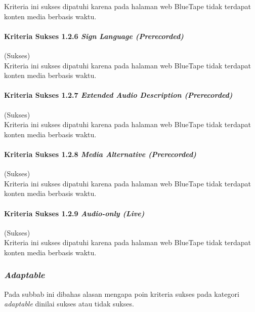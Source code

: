 Kriteria ini sukses dipatuhi karena pada halaman web BlueTape tidak terdapat konten media berbasis waktu.

\paragraph{Kriteria Sukses 1.2.6 \textit{Sign Language (Prerecorded)}}
\label{par:kepatuhan_bluetape_kriteria_sukses_1.2.6}
(Sukses)\\

Kriteria ini sukses dipatuhi karena pada halaman web BlueTape tidak terdapat konten media berbasis waktu.

\paragraph{Kriteria Sukses 1.2.7 \textit{Extended Audio Description (Prerecorded)}}
\label{par:kepatuhan_bluetape_kriteria_sukses_1.2.7}
(Sukses)\\

Kriteria ini sukses dipatuhi karena pada halaman web BlueTape tidak terdapat konten media berbasis waktu.

\paragraph{Kriteria Sukses 1.2.8 \textit{Media Alternative (Prerecorded)}}
\label{par:kepatuhan_bluetape_kriteria_sukses_1.2.8}
(Sukses)\\

Kriteria ini sukses dipatuhi karena pada halaman web BlueTape tidak terdapat konten media berbasis waktu.

\paragraph{Kriteria Sukses 1.2.9 \textit{Audio-only (Live)}}
\label{par:kepatuhan_bluetape_kriteria_sukses_1.2.9}
(Sukses)\\

Kriteria ini sukses dipatuhi karena pada halaman web BlueTape tidak terdapat konten media berbasis waktu.

\subsubsection{\textit{Adaptable}}
\label{subsubsec:kepatuhan_bluetape_adaptable}
Pada subbab ini dibahas alasan mengapa poin kriteria sukses pada kategori \textit{adaptable} dinilai sukses atau tidak sukses.

